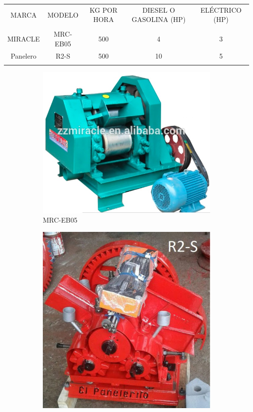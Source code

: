 \documentclass{article}%
\begin{document}
\linebreak%
\begin{tabular}{ccccc}%
MARCA&MODELO&KG POR HORA&DIESEL O GASOLINA (HP)&ELÉCTRICO (HP)\\%
&&&&\\%
MIRACLE&MRC{-}EB05&500&4&3\\%
Panelero&R2{-}S&500&10&5\\%
\linebreak%
\newline%
%
\linebreak%
\end{tabular}%


\begin{figure}[h!]%
\begin{subfigure}{0.33\linewidth}%
\includegraphics[width=0.95\linewidth]{Molinos/MRC-EB05.jpg}%
\caption{MRC{-}EB05}%
\end{subfigure}%
\begin{subfigure}{0.33\linewidth}%
\includegraphics[width=0.95\linewidth]{Molinos/R2-S.jpg}%

\end{subfigure}
\end{figure}
\end{document}
